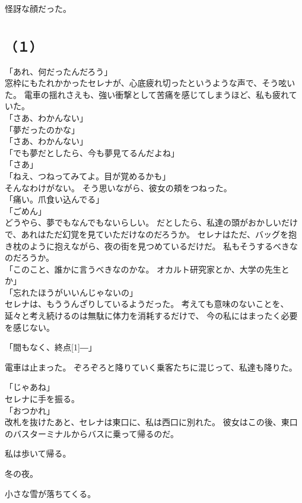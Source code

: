 \documentclass[../IHMain]{subfiles}
\begin{document}
怪訝な顔だった。

\section{}
\subsection*{（１）}
「あれ、何だったんだろう」\\
窓枠にもたれかかったセレナが、心底疲れ切ったというような声で、そう呟いた。
電車の揺れさえも、強い衝撃として苦痛を感じてしまうほど、私も疲れていた。\\
「さあ、わかんない」\\
「夢だったのかな」\\
「さあ、わかんない」\\
「でも夢だとしたら、今も夢見てるんだよね」\\
「さあ」\\
「ねえ、つねってみてよ。目が覚めるかも」\\
そんなわけがない。
そう思いながら、彼女の頬をつねった。\\
「痛い。爪食い込んでる」\\
「ごめん」\\
どうやら、夢でもなんでもないらしい。
だとしたら、私達の頭がおかしいだけで、あれはただ幻覚を見ていただけなのだろうか。
セレナはただ、バッグを抱き枕のように抱えながら、夜の街を見つめているだけだ。
私もそうするべきなのだろうか。\\
「このこと、誰かに言うべきなのかな。
オカルト研究家とか、大学の先生とか」\\
「忘れたほうがいいんじゃないの」\\
セレナは、もううんざりしているようだった。
考えても意味のないことを、延々と考え続けるのは無駄に体力を消耗するだけで、
今の私にはまったく必要を感じない。

「間もなく、終点\scalebox{3}[1]{―}」

電車は止まった。
ぞろぞろと降りていく乗客たちに混じって、私達も降りた。

「じゃあね」\\
セレナに手を振る。\\
「おつかれ」\\
改札を抜けたあと、セレナは東口に、私は西口に別れた。
彼女はこの後、東口のバスターミナルからバスに乗って帰るのだ。

私は歩いて帰る。

冬の夜。

小さな雪が落ちてくる。
\end{document}
